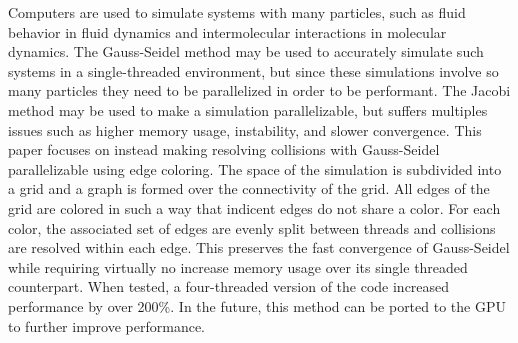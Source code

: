 
\indent \indent Computers are used to simulate systems with many particles, such as fluid behavior in fluid dynamics and intermolecular interactions in molecular dynamics. 
The Gauss-Seidel method may be used to accurately simulate such systems in a single-threaded environment, but since these simulations involve so many particles they need to be parallelized in order to be performant. 
The Jacobi method may be used to make a simulation parallelizable, but suffers multiples issues such as higher memory usage, instability, and slower convergence. 
This paper focuses on instead making resolving collisions with
Gauss-Seidel parallelizable using edge coloring.
The space of the simulation is subdivided into a grid and a graph is formed over the connectivity of the grid. 
All edges of the grid are colored in such a way that indicent edges do not share a color.
For each color, the associated set of edges are evenly split between threads and collisions
are resolved within each edge.
This preserves the fast convergence of Gauss-Seidel while requiring virtually no increase memory usage over its single threaded counterpart. 
When tested, a four-threaded version of the code increased performance by over 200\%. 
In the future, this method can be ported to the GPU to further improve performance.


\pagebreak{}
